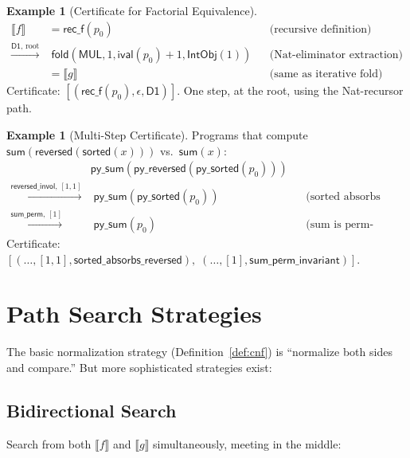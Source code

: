 \documentclass[11pt,a4paper]{report}
\theoremstyle{definition}
\newtheorem{example}[definition]{Example}
\theoremstyle{plain}
\newcommand{\den}[1]{\llbracket #1 \rrbracket}
\newcommand{\fold}{\mathsf{fold}}
\begin{document}
\begin{example}[Certificate for Factorial Equivalence]
\begin{align}
  \den{f} &= \mathsf{rec\_f}(p_0)
    && \text{(recursive definition)} \\
  \xrightarrow{\mathsf{D1},\, \text{root}} &\;
    \fold(\mathsf{MUL}, 1, \mathsf{ival}(p_0)+1, \mathsf{IntObj}(1))
    && \text{(Nat-eliminator extraction)} \\
  &= \den{g}
    && \text{(same as iterative fold)}
\end{align}
Certificate: $[(\mathsf{rec\_f}(p_0), \epsilon, \mathsf{D1})]$.
One step, at the root, using the Nat-recursor path.
\end{example}

\begin{example}[Multi-Step Certificate]
Programs that compute $\mathsf{sum}(\mathsf{reversed}(\mathsf{sorted}(x)))$
vs.\ $\mathsf{sum}(x)$:
\begin{align}
  &\mathsf{py\_sum}(\mathsf{py\_reversed}(\mathsf{py\_sorted}(p_0))) \\
  \xrightarrow{\mathsf{reversed\_invol},\, [1,1]} &\;
    \mathsf{py\_sum}(\mathsf{py\_sorted}(p_0))
    && \text{(sorted absorbs reversed)} \\
  \xrightarrow{\mathsf{sum\_perm},\, [1]} &\;
    \mathsf{py\_sum}(p_0)
    && \text{(sum is perm-invariant)}
\end{align}
Certificate: $[(\ldots, [1,1], \mathsf{sorted\_absorbs\_reversed}),\;
(\ldots, [1], \mathsf{sum\_perm\_invariant})]$.
\end{example}

\section{Path Search Strategies}

The basic normalization strategy (Definition~\ref{def:cnf}) is
``normalize both sides and compare.''  But more sophisticated
strategies exist:

\subsection{Bidirectional Search}

Search from both $\den{f}$ and $\den{g}$ simultaneously,
meeting in the middle:
\end{document}
